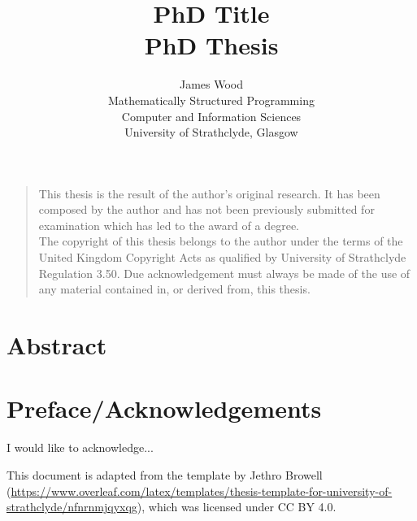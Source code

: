 \documentclass[a4paper,oneside,11pt]{book}
\title{PhD Title \\ PhD Thesis}
\author{James Wood
\\ \small Mathematically Structured Programming\\[-0.8ex]
\small Computer and Information Sciences\\[-0.8ex]
\small University of Strathclyde, Glasgow\\
}
\begin{document}
\maketitle


\frontmatter

\vspace*{\fill}
\noindent
\begin{quote}
  \centering
  This thesis is the result of the author's original research. It has been composed by the author and has not been previously submitted for examination which has led to the award of a degree. \\[5pt]
  The copyright of this thesis belongs to the author under the terms of the United Kingdom Copyright Acts as qualified by University of Strathclyde Regulation 3.50. Due acknowledgement must always be made of the use of any material contained in, or derived from, this thesis. \\[5pt]
\end{quote}
\vspace*{\fill}



\chapter{Abstract}



\tableofcontents

\listoffigures

\listoftables



\chapter{Preface/Acknowledgements}
I would like to acknowledge...

This document is adapted from the template by Jethro Browell
(\url{https://www.overleaf.com/latex/templates/thesis-template-for-university-of-strathclyde/nfnrnmjqyxqg}),
which was licensed under CC BY 4.0.



\mainmatter
\end{document}
